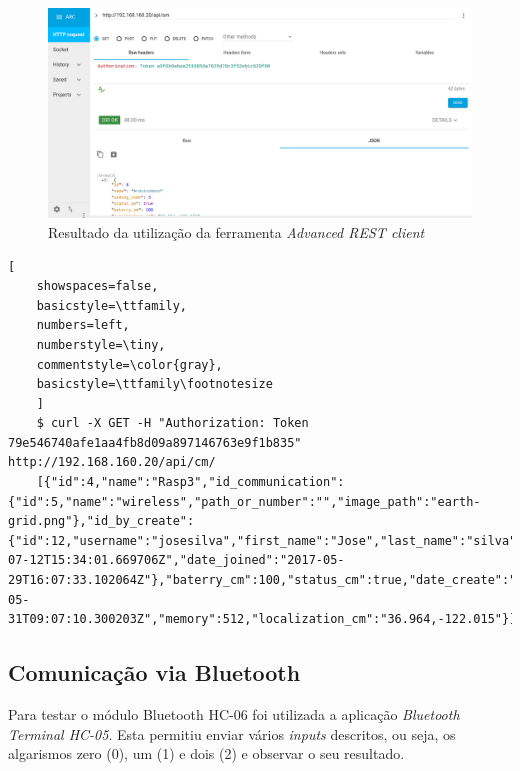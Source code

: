 \begin{figure}[h]
	\centering
	\includegraphics[width=0.7\linewidth]{prints-web/API_teste1.png}
	\caption{Resultado da utilização da ferramenta \textit{Advanced REST client}}
	\label{testgrap}
\end{figure}

	\begin{lstlisting}[
	showspaces=false,
	basicstyle=\ttfamily,
	numbers=left,
	numberstyle=\tiny,
	commentstyle=\color{gray},
	basicstyle=\ttfamily\footnotesize
	]
	$ curl -X GET -H "Authorization: Token  79e546740afe1aa4fb8d09a897146763e9f1b835" http://192.168.160.20/api/cm/
	[{"id":4,"name":"Rasp3","id_communication":{"id":5,"name":"wireless","path_or_number":"","image_path":"earth-grid.png"},"id_by_create":{"id":12,"username":"josesilva","first_name":"Jose","last_name":"silva","email":"ruipedrooliveira@ua.pt","last_login":"2017-07-12T15:34:01.669706Z","date_joined":"2017-05-29T16:07:33.102064Z"},"baterry_cm":100,"status_cm":true,"date_create":"2017-05-31T09:07:10.300203Z","memory":512,"localization_cm":"36.964,-122.015"}]
	\end{lstlisting}
	
	


\subsection{Comunicação via Bluetooth }


Para testar o módulo Bluetooth HC-06 foi utilizada a aplicação \textit{Bluetooth Terminal HC-05}. Esta permitiu enviar vários \textit{inputs} descritos, ou seja,  os algarismos zero (0), um (1) e dois (2) e observar o seu resultado.  


